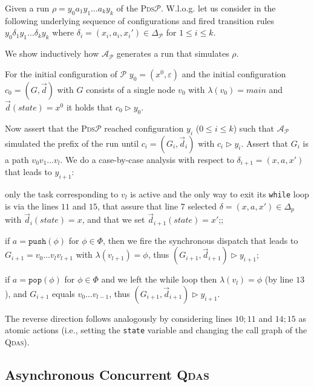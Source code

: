 \documentclass[runningheads,oribibl,]{article}
\newcommand{\Aa}{\ensuremath{\mathcal{A}}\xspace}
\newcommand{\Pp}{\ensuremath{\mathcal{P}}\xspace}
\newcommand{\e}{\ensuremath{\varepsilon}\xspace}
\newcommand{\cfont}[1]{\ensuremath{\mathtt{#1}}\xspace}
\newcommand{\main}{\ensuremath{\textit{main}}\xspace}
\newcommand{\pds}{\textsc{Pds}\xspace}
\newcommand{\qdas}{\textsc{Qdas}\xspace}
\newcommand{\Graph}{\ensuremath{G}}
\newcommand{\Data}{\ensuremath{\vec{d}}}
\newcommand{\push}{\ensuremath{\cfont{push}}}
\newcommand{\pop}{\ensuremath{\cfont{pop}}}
\newenvironment{myitemize}{\begin{list}{\labelitemi}{\setlength{\topsep}{4pt}\setlength{\partopsep}{0pt}
\setlength{\itemsep}{0pt}
\setlength{\itemindent}{0ex}
\setlength{\listparindent}{0ex}
\setlength{\leftmargin}{4ex}\setlength{\labelwidth}{2ex}
}}
{\end{list}}
\newenvironment{proof}{\noindent{\it Proof.\hspace*{.5cm}}}{}
\begin{document}
\begin{proof}
  Given a run $\rho=y_0 a_1 y_1 \dots a_k y_k$ of the \pds $\Pp$.
  W.l.o.g. let us consider in the following underlying sequence
  of configurations and fired transition rules
  $y_0 \delta_1 y_1 \dots \delta_k y_k$ where
  $\delta_i=(x_i,a_i,x_i')\in\Delta_\Pp$ for $1\leq i \leq k$.

  We show inductively how $\Aa_\Pp$ generates a run that
  simulates $\rho$.

  For the initial configuration of $\Pp$ $y_0=(x^0,\e)$
  and the initial configuration $c_0=(\Graph,\Data)$
  with $\Graph$ consists of a single node $v_0$ with
  $\lambda(v_0)=\main$ and $\Data(state)=x^0$ it holds
  that $c_0 \triangleright y_0$.

  Now assert that the \pds $\Pp$ reached configuration $y_i$ ($0\leq i \leq k$)
  such that $\Aa_\Pp$ simulated the prefix of the run until
  $c_i=(\Graph_i,\Data_i)$ with
  $c_i\triangleright y_i$. Assert that $\Graph_i$ is a path $v_0 v_1\dots v_l$.
  We do a case-by-case analysis with respect
  to $\delta_{i+1}=(x,a,x')$ that leads to $y_{i+1}$:
  \begin{myitemize}
    \item only the task corresponding to $v_l$ is active and
      the only way to exit its \texttt{while} loop is
      via the lines $11$ and $15$, that assure that line $7$ selected
      $\delta=(x,a,x')\in\Delta_p$ with $\Data_i(state)=x$, and that we
      set $\Data_{i+1}(state)=x'$;;
    \item if $a=\push(\phi)$ for $\phi\in\Phi$, then
      we fire the synchronous dispatch that leads to $\Graph_{i+1}=
      v_0\dots v_l v_{l+1}$ with $\lambda(v_{l+1})=\phi$, thus
      $(\Graph_{i+1},\Data_{i+1})\triangleright y_{i+1}$;
    \item if $a=\pop(\phi)$ for $\phi\in\Phi$ and we left the
      while loop then $\lambda(v_l)= \phi$  (by line $13$), and
      $\Graph_{i+1}$ equals $v_0 \dots v_{l-1}$, thus
      $(\Graph_{i+1},\Data_{i+1})\triangleright y_{i+1}$.
  \end{myitemize}

  The reverse direction follows analogously by considering lines $10;11$
  and $14;15$ as atomic actions (i.e., setting the \texttt{state} variable
  and changing the call graph of the \qdas).
\end{proof}
\subsection{Asynchronous Concurrent \qdas}
\end{document}
